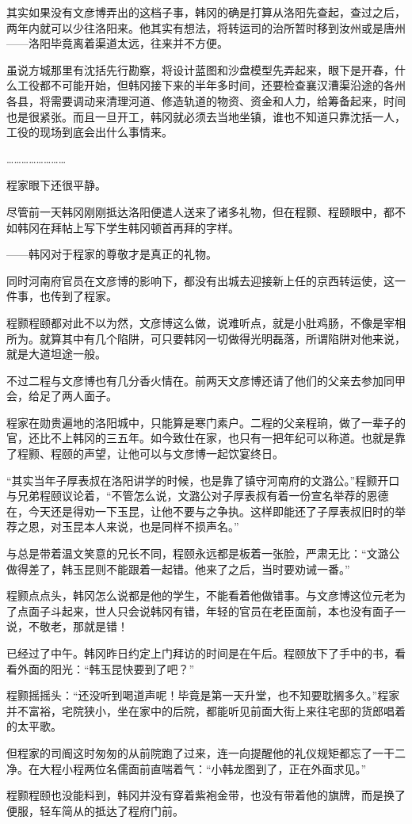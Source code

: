 其实如果没有文彦博弄出的这档子事，韩冈的确是打算从洛阳先查起，查过之后，两年内就可以少往洛阳来。他其实有想法，将转运司的治所暂时移到汝州或是唐州——洛阳毕竟离着渠道太远，往来并不方便。

虽说方城那里有沈括先行勘察，将设计蓝图和沙盘模型先弄起来，眼下是开春，什么工役都不可能开始，但韩冈接下来的半年多时间，还要检查襄汉漕渠沿途的各州各县，将需要调动来清理河道、修造轨道的物资、资金和人力，给筹备起来，时间也是很紧张。而且一旦开工，韩冈就必须去当地坐镇，谁也不知道只靠沈括一人，工役的现场到底会出什么事情来。

……………………

程家眼下还很平静。

尽管前一天韩冈刚刚抵达洛阳便遣人送来了诸多礼物，但在程颢、程颐眼中，都不如韩冈在拜帖上写下学生韩冈顿首再拜的字样。

——韩冈对于程家的尊敬才是真正的礼物。

同时河南府官员在文彦博的影响下，都没有出城去迎接新上任的京西转运使，这一件事，也传到了程家。

程颢程颐都对此不以为然，文彦博这么做，说难听点，就是小肚鸡肠，不像是宰相所为。就算其中有几个陷阱，可只要韩冈一切做得光明磊落，所谓陷阱对他来说，就是大道坦途一般。

不过二程与文彦博也有几分香火情在。前两天文彦博还请了他们的父亲去参加同甲会，给足了两人面子。

程家在勋贵遍地的洛阳城中，只能算是寒门素户。二程的父亲程珦，做了一辈子的官，还比不上韩冈的三五年。如今致仕在家，也只有一把年纪可以称道。也就是靠了程颢、程颐的声望，让他可以与文彦博一起饮宴终日。

“其实当年子厚表叔在洛阳讲学的时候，也是靠了镇守河南府的文潞公。”程颢开口与兄弟程颐议论着，“不管怎么说，文潞公对子厚表叔有着一份宣名举荐的恩德在，今天还是得劝一下玉昆，让他不要与之争执。这样即能还了子厚表叔旧时的举荐之恩，对玉昆本人来说，也是同样不损声名。”

与总是带着温文笑意的兄长不同，程颐永远都是板着一张脸，严肃无比：“文潞公做得差了，韩玉昆则不能跟着一起错。他来了之后，当时要劝诫一番。”

程颢点点头，韩冈怎么说都是他的学生，不能看着他做错事。与文彦博这位元老为了点面子斗起来，世人只会说韩冈有错，年轻的官员在老臣面前，本也没有面子一说，不敬老，那就是错！

已经过了中午。韩冈昨日约定上门拜访的时间是在午后。程颐放下了手中的书，看看外面的阳光：“韩玉昆快要到了吧？”

程颢摇摇头：“还没听到喝道声呢！毕竟是第一天升堂，也不知要耽搁多久。”程家并不富裕，宅院狭小，坐在家中的后院，都能听见前面大街上来往宅邸的货郎唱着的太平歌。

但程家的司阍这时匆匆的从前院跑了过来，连一向提醒他的礼仪规矩都忘了一干二净。在大程小程两位名儒面前直喘着气：“小韩龙图到了，正在外面求见。”

程颢程颐也没能料到，韩冈并没有穿着紫袍金带，也没有带着他的旗牌，而是换了便服，轻车简从的抵达了程府门前。

